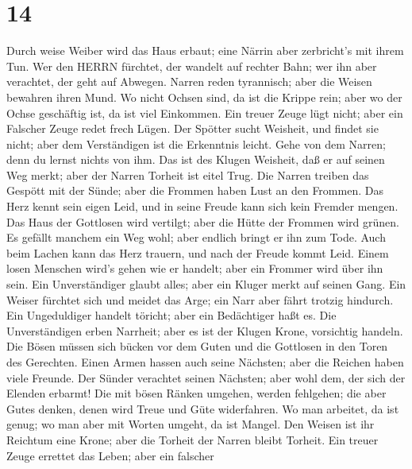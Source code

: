 \hypertarget{section-13}{%
\section{14}\label{section-13}}

 Durch weise Weiber wird das Haus erbaut; eine Närrin aber
zerbricht's mit ihrem Tun.  Wer den HERRN fürchtet, der
wandelt auf rechter Bahn; wer ihn aber verachtet, der geht auf Abwegen.
 Narren reden tyrannisch; aber die Weisen bewahren ihren
Mund.  Wo nicht Ochsen sind, da ist die Krippe rein; aber wo
der Ochse geschäftig ist, da ist viel Einkommen.  Ein treuer
Zeuge lügt nicht; aber ein Falscher Zeuge redet frech Lügen.
 Der Spötter sucht Weisheit, und findet sie nicht; aber dem
Verständigen ist die Erkenntnis leicht.  Gehe von dem
Narren; denn du lernst nichts von ihm.  Das ist des Klugen
Weisheit, daß er auf seinen Weg merkt; aber der Narren Torheit ist eitel
Trug.  Die Narren treiben das Gespött mit der Sünde; aber
die Frommen haben Lust an den Frommen.  Das Herz kennt sein
eigen Leid, und in seine Freude kann sich kein Fremder mengen.
 Das Haus der Gottlosen wird vertilgt; aber die Hütte der
Frommen wird grünen.  Es gefällt manchem ein Weg wohl; aber
endlich bringt er ihn zum Tode.  Auch beim Lachen kann das
Herz trauern, und nach der Freude kommt Leid.  Einem losen
Menschen wird's gehen wie er handelt; aber ein Frommer wird über ihn
sein.  Ein Unverständiger glaubt alles; aber ein Kluger
merkt auf seinen Gang.  Ein Weiser fürchtet sich und meidet
das Arge; ein Narr aber fährt trotzig hindurch.  Ein
Ungeduldiger handelt töricht; aber ein Bedächtiger haßt es.
 Die Unverständigen erben Narrheit; aber es ist der Klugen
Krone, vorsichtig handeln.  Die Bösen müssen sich bücken
vor dem Guten und die Gottlosen in den Toren des Gerechten.
 Einen Armen hassen auch seine Nächsten; aber die Reichen
haben viele Freunde.  Der Sünder verachtet seinen Nächsten;
aber wohl dem, der sich der Elenden erbarmt!  Die mit bösen
Ränken umgehen, werden fehlgehen; die aber Gutes denken, denen wird
Treue und Güte widerfahren.  Wo man arbeitet, da ist genug;
wo man aber mit Worten umgeht, da ist Mangel.  Den Weisen
ist ihr Reichtum eine Krone; aber die Torheit der Narren bleibt Torheit.
 Ein treuer Zeuge errettet das Leben; aber ein falscher
